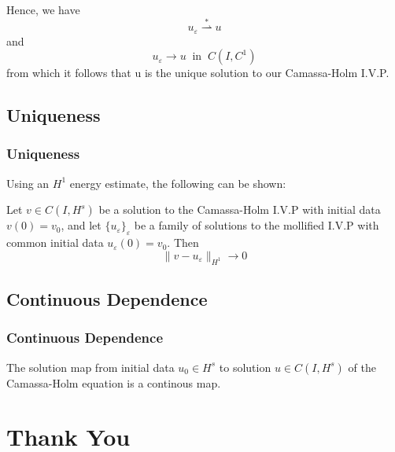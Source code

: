 \documentclass{beamer}
\newcommand{\ee}{\varepsilon}
\begin{document}
\begin{frame}
	Hence, we have
	\begin{equation*}
		u_\ee \overset{*}{\rightharpoonup} u
	\end{equation*}
	and 
	\begin{equation*}
		u_\ee \to u \; \; \text{in} \; \; C(I, C^1)
	\end{equation*}
	from which it follows that u is the unique solution
	to our Camassa-Holm I.V.P.
 \end{frame}
 \begin{frame}
	 \section{Uniqueness}
	 \frametitle{Uniqueness}
	Using an $H^1$ energy estimate, the following can be shown:
	\vskip0.1in
	\begin{theorem}
		Let $v \in C(I, H^s)$ be a solution to the Camassa-Holm I.V.P with
		initial data $v(0)= v_0$, and let $\{u_\ee\}_\ee$ be a family of
		solutions to the mollified I.V.P with common initial data
		$u_\ee(0)=v_0$. Then
		\begin{equation*}
			\|v -u_\ee\|_{H^1} \to 0
		\end{equation*}
	\end{theorem}
 \end{frame}
 \begin{frame}
 \section{Continuous Dependence}
     \frametitle{Continuous Dependence}
 \begin{theorem}
	 \vskip0.1in
     The solution map from initial data $u_0 \in H^s$ to solution $u\in
	 C(I,H^s)$
     of the Camassa-Holm equation is a continous map.
 \end{theorem}
 \end{frame}
 
 \section{Thank You}
 \begin{frame}
	 \frametitle{}
\end{frame} 
 
\end{document}
